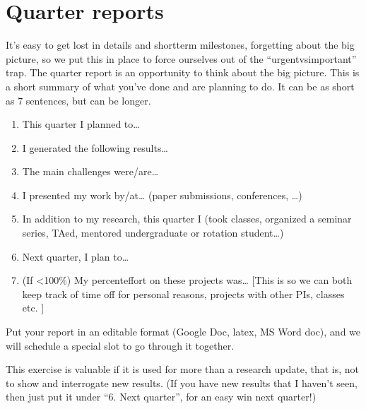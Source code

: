 \documentclass[letterpaper,10pt,english]{sphinxmanual}
\begin{document}
\section{Quarter reports}
\label{\detokenize{04WhatIsAPhD:quarter-reports}}
\sphinxAtStartPar
It’s easy to get lost in details and short\sphinxhyphen{}term milestones, forgetting about the big picture, so we put this in place to force ourselves out of the “urgent\sphinxhyphen{}vs\sphinxhyphen{}important” trap.
The quarter report is an opportunity to think about the big picture.
This is a short summary of what you’ve done and are planning to do.
It can be as short as 7 sentences, but can be longer.
\begin{enumerate}
%
\item {} 
\sphinxAtStartPar
This quarter I planned to…

\item {} 
\sphinxAtStartPar
I generated the following results…

\item {} 
\sphinxAtStartPar
The main challenges were/are…

\item {} 
\sphinxAtStartPar
I presented my work by/at… (paper submissions, conferences, …)

\item {} 
\sphinxAtStartPar
In addition to my research, this quarter I (took classes, organized a seminar series, TAed, mentored undergraduate or rotation student…)

\item {} 
\sphinxAtStartPar
Next quarter, I plan to…

\item {} 
\sphinxAtStartPar
(If \textless{}100\%) My percent\sphinxhyphen{}effort on these projects was… {[}This is so we can both keep track of time off for personal reasons, projects with other PIs, classes etc. {]}

\end{enumerate}

\sphinxAtStartPar
Put your report in an editable format (Google Doc, latex, MS Word doc), and we will schedule a special slot to go through it together.

\sphinxAtStartPar
This exercise is valuable if it is used for more than a research update, that is, not to show and interrogate new results. (If you have new results that I haven’t seen, then just put it under “6. Next quarter”, for an easy win next quarter!)
\end{document}
